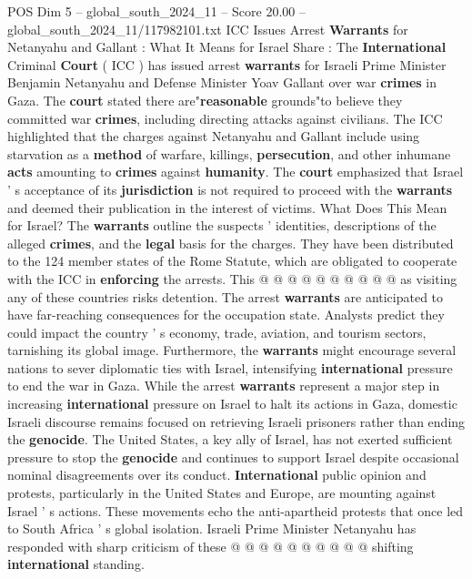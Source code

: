 \begin{textsample}{POS Dim 5 – global\_south\_2024\_11 – Score 20.00 – global\_south\_2024\_11/117982101.txt}  \label{ex:f5_pos_023}
ICC Issues Arrest \textbf{Warrants} for Netanyahu and Gallant : What It Means for Israel Share : The \textbf{International} Criminal \textbf{Court} ( ICC ) has issued arrest \textbf{warrants} for Israeli Prime Minister Benjamin Netanyahu and Defense Minister Yoav Gallant over war \textbf{crimes} in Gaza.
The \textbf{court} stated there are"\textbf{reasonable} grounds"to believe they committed war \textbf{crimes}, including directing attacks against civilians.
The ICC highlighted that the charges against Netanyahu and Gallant include using starvation as a \textbf{method} of warfare, killings, \textbf{persecution}, and other inhumane \textbf{acts} amounting to \textbf{crimes} against \textbf{humanity}.
The \textbf{court} emphasized that Israel ' s acceptance of its \textbf{jurisdiction} is not required to proceed with the \textbf{warrants} and deemed their publication in the interest of victims.
What Does This Mean for Israel?
The \textbf{warrants} outline the suspects ' identities, descriptions of the alleged \textbf{crimes}, and the \textbf{legal} basis for the charges.
They have been distributed to the 124 member states of the Rome Statute, which are obligated to cooperate with the ICC in \textbf{enforcing} the arrests.
This @ @ @ @ @ @ @ @ @ @ as visiting any of these countries risks detention.
The arrest \textbf{warrants} are anticipated to have far-reaching consequences for the occupation state.
Analysts predict they could impact the country ' s economy, trade, aviation, and tourism sectors, tarnishing its global image.
Furthermore, the \textbf{warrants} might encourage several nations to sever diplomatic ties with Israel, intensifying \textbf{international} pressure to end the war in Gaza.
While the arrest \textbf{warrants} represent a major step in increasing \textbf{international} pressure on Israel to halt its actions in Gaza, domestic Israeli discourse remains focused on retrieving Israeli prisoners rather than ending the \textbf{genocide}.
The United States, a key ally of Israel, has not exerted sufficient pressure to stop the \textbf{genocide} and continues to support Israel despite occasional nominal disagreements over its conduct. \textbf{International} public opinion and protests, particularly in the United States and Europe, are mounting against Israel ' s actions.
These movements echo the anti-apartheid protests that once led to South Africa ' s global isolation.
Israeli Prime Minister Netanyahu has responded with sharp criticism of these @ @ @ @ @ @ @ @ @ @ shifting \textbf{international} standing.

\end{textsample}
